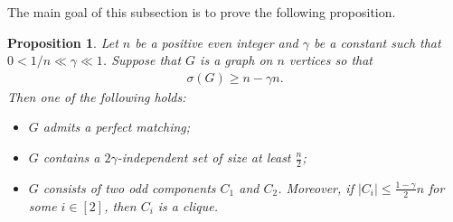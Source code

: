 \documentclass[11pt, a4paper]{article}
\newtheorem{proposition}[theorem]{Proposition}
\theoremstyle{definition}
\newcommand{\<}{\subseteq}
\begin{document}
The main goal of this subsection is to prove the following proposition. 
\begin{proposition}\label{PMatching}
Let $n$ be a positive even integer and $\gamma$ be a constant such that $0<{1}/{n}\ll\gamma\ll 1$. Suppose that $G$ is a graph on $n$ vertices so that 
\begin{align}\label{B2Ore}
\sigma(G)\ge n-\gamma n.
\end{align}
Then one of the following holds:
\begin{itemize}
\setlength{\parskip}{0pt}
    \item[{\rm (i)}] $G$ admits a perfect matching;
    \item[{\rm (ii)}] $G$ contains a $2\gamma$-independent set of size at least $\frac{n}{2}$;
    \item[{\rm (iii)}] $G$ consists of two odd components $C_1$ and $C_2$. Moreover, if $|C_i|\leq \frac{1-\gamma}{2}n$ for some $i\in [2]$, then %
    $C_i$ is a clique.
\end{itemize}
\end{proposition}
\end{document}
